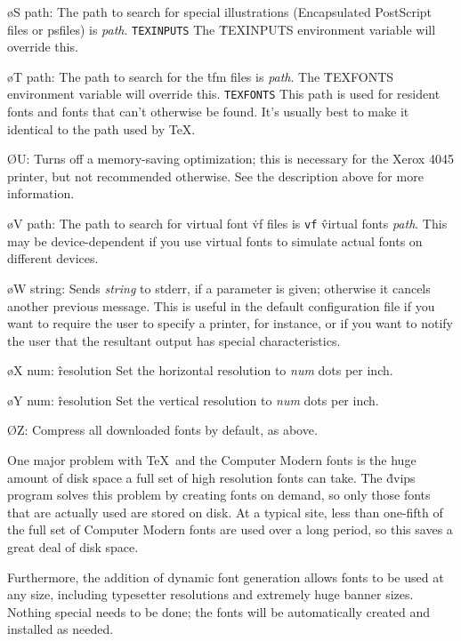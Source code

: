 {\o S path:  The path to search for special illustrations
(Encapsulated PostScript files or psfiles) is {\it path}.
\^{{\tt TEXINPUTS}}
The \.{TEXINPUTS} environment variable will override this.

\o T path: The path to search for the \.{tfm} files is
{\it path}.  The \.{TEXFONTS} environment variable will override this.
\^{{\tt TEXFONTS}}
This path is used for resident fonts and fonts that can't otherwise be found.
It's usually best to make it identical to the path used by \TeX.

\O U:  Turns off a memory-saving optimization; this is necessary for the
Xerox 4045 printer, but not recommended otherwise.  See the description
above for more information.

\o V path:  The path to search for virtual font \.{vf} files is
\^{{\tt vf}}
\^{virtual fonts}
{\it path}.
This may be device-dependent if you use virtual fonts to simulate
actual fonts on different devices.

\o W string:
Sends {\it string} to stderr, if a parameter is given; otherwise it cancels
another previous  message.
This is useful in the default configuration file if you want to require
the user to specify a printer, for instance, or if you want to notify
the user that the resultant output has special characteristics.

\o X num:
\^{resolution}
Set the horizontal resolution to {\it num} dots per inch.

\o Y num:
\^{resolution}
Set the vertical resolution to {\it num} dots per inch.

\O Z:  Compress all downloaded fonts by default, as above.\par}


One major problem with \TeX\ and the Computer Modern fonts is the huge
amount of disk space a full set of high resolution fonts can take.  The
\.{dvips} program solves this problem by creating fonts on demand, so only
those fonts that are actually used are stored on disk.  At a typical site,
less than one-fifth of the full set of Computer Modern fonts are used over
a long period, so this saves a great deal of disk space.

Furthermore, the addition of dynamic font generation allows fonts to be
used at any size, including typesetter resolutions and extremely huge
banner sizes.  Nothing special needs to be done; the fonts will be
automatically created and installed as needed.

